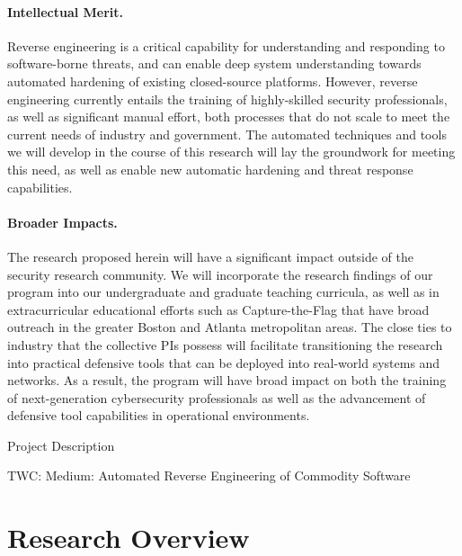 \documentclass[letterpaper,twoside,11pt,headings=small]{scrartcl}
\newcommand{\basetitle}{TWC: Medium: Automated Reverse Engineering of Commodity Software}
\newcommand{\thetitle}{\basetitle\xspace}
\begin{document}

\paragraph{Intellectual Merit.} Reverse engineering is a critical capability
for understanding and responding to software-borne threats, and can enable
deep system understanding towards automated hardening of existing
closed-source platforms.  However, reverse engineering currently entails the training
of highly-skilled security professionals, as well as significant manual
effort, both processes that do not scale to meet the current needs of industry
and government.  The automated techniques and tools we will develop in the
course of this research will lay the groundwork for meeting this need, as well
as enable new automatic hardening and threat response capabilities.

\paragraph{Broader Impacts.} The research proposed herein will have a
significant impact outside of the security research community.  We will
incorporate the research findings of our program into our undergraduate and
graduate teaching curricula, as well as in extracurricular educational efforts
such as Capture-the-Flag that have broad outreach in the greater Boston and
Atlanta metropolitan areas.  The close ties to industry that the collective
PIs possess will facilitate transitioning the research into practical
defensive tools that can be deployed into real-world systems and networks. As
a result, the program will have broad impact on both the training of
next-generation cybersecurity professionals as well as the advancement of
defensive tool capabilities in operational environments.

\newpage
{}
\setcounter{page}{1}

{\sffamily\bfseries
\begin{center}
\fontsize{16}{16}\selectfont Project Description

\fontsize{13}{13}\selectfont \thetitle
\end{center}
}

\section{Research Overview}
\label{sec:overview}
\end{document}
